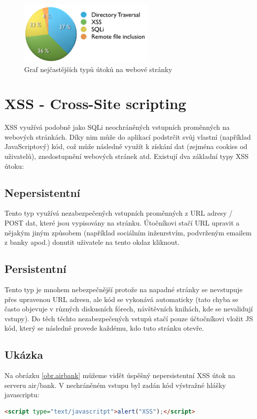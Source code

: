 \documentclass[12pt, a4paper]{report}
\begin{document}
\begin{figure}[h!]
\centerline{\includegraphics[width=250px]{./examples/chart.png}}
\caption{Graf nejčastějších typů útoků na webové stránky}
\label{chart.attack}
\end{figure}


\section{XSS - Cross-Site scripting}
XSS využívá podobně jako SQLi neochráněných vstupních proměnných na webových stránkách. Díky nim může do aplikací podstrčit svůj vlastní (například JavaScriptový) kód, což může následně využít k získání dat (zejména cookies od uživatelů), znedostupnění webových stránek atd. Existují dva základní typy XSS útoku:

\subsection{Nepersistentní}
Tento typ využívá nezabezpečených vstupních proměnných z URL adresy / POST dat, které jsou vypisovány na stránku. Útočníkovi stačí URL upravit a nějakým jiným způsobem (například sociálním inženrstvím, podvrženým emailem z banky apod.) donutit uživatele na tento okdaz kliknout. 

\subsection{Persistentní}
Tento typ je mnohem nebezpečnější protože na napadné stránky se nevstupuje přes upravenou URL adresu, ale kód se vykonává automaticky (tato chyba se často objevuje v různých diskusních fórech, návštěvních knihách, kde se nevalidují vstupy). Do těch těchto nezabezpečených vstupů stačí pouze účtočníkovi vložit JS kód, který se následně provede každému, kdo tuto stránku otevře. 

\subsection{Ukázka}
Na obrázku \ref{obr.airbank} můžeme vidět úspěšný nepersistentní XSS útok na serveru air/bank. V nechráněném vstupu byl zadán kód výstražné hlášky javascriptu:
\begin{lstlisting}[label=some-code, language=HTML, caption=Výstražná hláška v jazyce JavaScript]
<script type="text/javascritpt">alert("XSS");</script>
\end{lstlisting}
\end{document}
